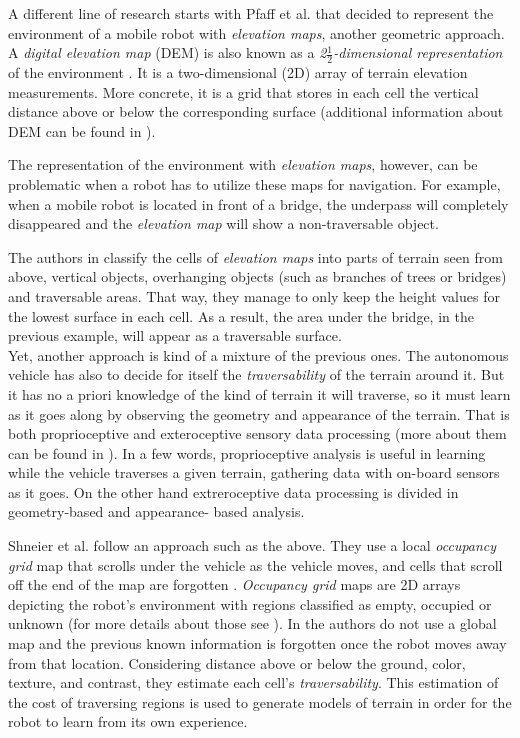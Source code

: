 \documentclass[12pt,a4paper]{report}
\newcommand{\etal}[1]{#1 et al.}
\newcommand{\term}{\textit}
\newcommand{\acronym}{\MakeUppercase}
\newcommand{\itfrac}[2]{\frac{\textit{#1}}{\textit{#2}}}
\begin{document}
	A different line of research starts with \etal{Pfaff} that decided to represent 
	the environment of a mobile robot with \term{elevation maps}, another geometric 
	approach. A \term{digital elevation map} (\acronym{dem}) is also known as a
	\term{2\(\itfrac{1}{2}\)-dimensional representation} of the environment 
	\cite{Pfaff}. It is a two-dimensional (\acronym{2d}) array of terrain elevation 
	measurements. More concrete, it is a grid that stores in each cell the vertical 
	distance above or below the corresponding surface (additional information about 
	\acronym{dem} can be found in \cite{Kweon}). 
	\par 
	The representation of the environment with \term{elevation maps}, however, can 
	be problematic when a robot has to utilize these maps for navigation. For 
	example, when a mobile robot is located in front of a bridge, the underpass will 
	completely disappeared and the \term{elevation map} will show a non-traversable 
	object.
	\par
	The authors in \cite{Pfaff} classify the cells of \term{elevation maps} into 
	parts of terrain seen from above, vertical objects,	overhanging objects (such as 
	branches of trees or bridges) and traversable areas. That way, they manage to 
	only keep the height values for the lowest surface in each cell. As a result, 
	the area under the bridge, in the previous example, will appear as a traversable 
	surface.
	\\
	
	Yet, another approach is kind of a mixture of the previous ones. The autonomous 
	vehicle has also to decide for itself the \term{traversability} of the terrain 
	around it. But it has no a priori knowledge of the kind of terrain it will 
	traverse, so it must learn as it goes along by observing the geometry and 
	appearance of the terrain. That is both proprioceptive and exteroceptive sensory 
	data processing (more about them can be found in \cite{Papadakis}). In a few 
	words, proprioceptive analysis is useful in learning while the vehicle traverses 
	a given terrain, gathering data with on-board sensors as it goes. On the other 
	hand extreroceptive data processing is divided in geometry-based and appearance-
	based analysis. 
	\par
	\etal{Shneier} follow an approach such as the above. They use a local 
	\term{occupancy grid} map that scrolls under the vehicle as the vehicle moves,
	and cells that scroll off the end of the map are forgotten \cite{Shneier}. 
	\term{Occupancy grid} maps are \acronym{2d} arrays depicting the robot’s 
	environment with regions classified as empty, occupied or unknown (for more 
	details about those see \cite{Moravec}). In \cite{Shneier} the authors do not 
	use a global map and the previous known information is forgotten once the robot 
	moves away from that location. Considering distance above or below the ground, 
	color, texture, and contrast, they estimate each cell’s \term{traversability}. 
	This estimation of the cost of traversing regions is used to generate models of 
	terrain in order for the robot to learn from its own experience.
	\\
	
\end{document}
